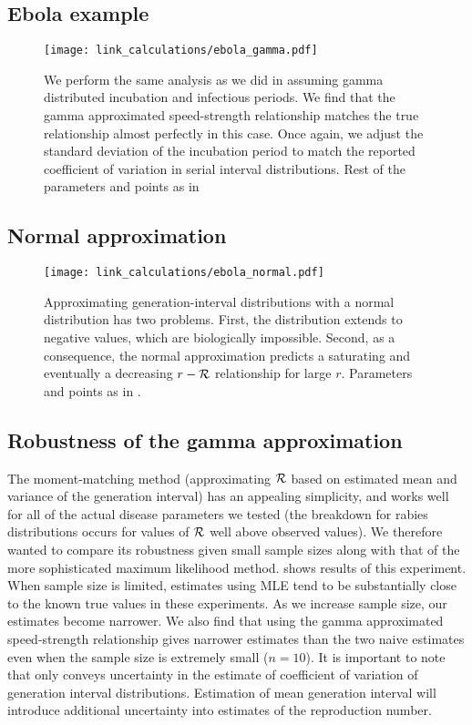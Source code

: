 \pagebreak
\subsection{Ebola example}

\begin{figure}[htbp] \centering
	\texttt{[image: link\_calculations/ebola\_gamma.pdf]}
\caption{
We perform the same analysis as we did in  assuming gamma distributed incubation and infectious periods. 
We find that the gamma approximated speed-strength relationship matches the true relationship almost perfectly in this case.
Once again, we adjust the standard deviation of the incubation period to match the reported coefficient of variation in serial interval distributions. Rest of the parameters and points as in 
}
	\label{fig:ebolaGamma}
\end{figure}

\pagebreak
\subsection{Normal approximation}

\begin{figure}[htbp] \centering
	\texttt{[image: link\_calculations/ebola\_normal.pdf]}
\caption{
Approximating generation-interval distributions with a normal distribution has two problems. First, the distribution extends to negative values, which are biologically impossible. Second, as a consequence, the normal approximation predicts a saturating and eventually a decreasing $r-{\cal R}$ relationship for large $r$. Parameters and points as in .
}
	\label{fig:ebolaNormal}
\end{figure}

\pagebreak
\subsection{Robustness of the gamma approximation}

The moment-matching method (approximating ${\cal R}$ based on estimated mean and variance of the generation interval) has an appealing simplicity, and works well for all of the actual disease parameters we tested (the breakdown for rabies distributions occurs for values of ${\cal R}$ well above observed values). We therefore wanted to compare its robustness given small sample sizes along with that of the more sophisticated maximum likelihood method.  shows results of this experiment. When sample size is limited, estimates using MLE tend to be substantially close to the known true values in these experiments. 
As we increase sample size, our estimates become narrower. 
We also find that using the gamma approximated speed-strength relationship gives narrower estimates than the two naive estimates even when the sample size is extremely small ($n = 10$).
It is important to note that  only conveys uncertainty in the estimate of coefficient of variation of generation interval distributions.
Estimation of mean generation interval will introduce additional uncertainty into estimates of the reproduction number. 

